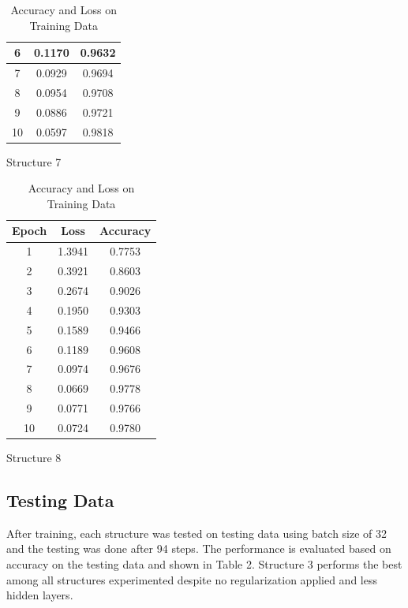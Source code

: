 \documentclass{article}
\begin{document}
\begin{table}[]
\begin{minipage}[b]{0.23\linewidth}
\begin{tabular}{|c|c|c|}
    \hline
    6&0.1170&0.9632\\
    \hline
    7&0.0929&0.9694\\
    \hline
    8&0.0954&0.9708\\
    \hline
    9&0.0886&0.9721\\
    \hline
    10&0.0597&0.9818\\
    \hline
  \end{tabular}
  \caption*{Structure 7}
  \end{minipage}
  \hspace{0.5cm}
  \begin{minipage}[b]{0.23\linewidth}
  \tiny
  \begin{tabular}{|c|c|c|}
    \hline
    Epoch&Loss&Accuracy\\
    \hline
    1&1.3941&0.7753\\
    \hline
    2&0.3921&0.8603\\
    \hline
    3&0.2674&0.9026\\
    \hline
    4&0.1950&0.9303\\
    \hline
    5&0.1589&0.9466\\
    \hline
    6&0.1189&0.9608\\
    \hline
    7&0.0974&0.9676\\
    \hline
    8&0.0669&0.9778\\
    \hline
    9&0.0771&0.9766\\
    \hline
    10&0.0724&0.9780\\
    \hline
  \end{tabular}
  \caption*{Structure 8}
  \end{minipage}
  \caption{Accuracy and Loss on Training Data}
  \label{t2:acc_loss_train_tab}
\end{table}

\subsection{Testing Data}

After training, each structure was tested on testing data using batch size of 32 and the testing was done after 94 steps. The performance is evaluated based on accuracy on the testing data and shown in Table 2. Structure 3 performs the best among all structures experimented despite no regularization applied and less hidden layers.
\end{document}

